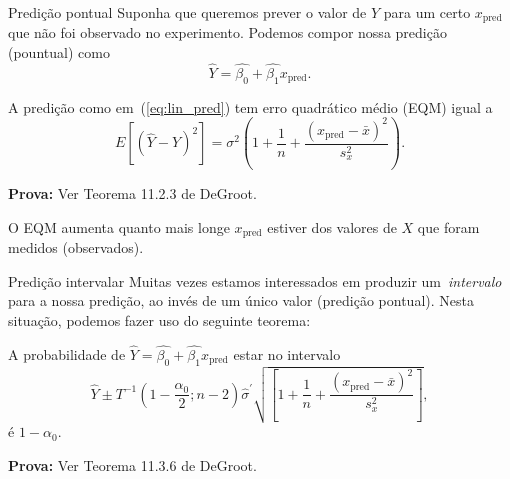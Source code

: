 \begin{frame}{Predição pontual}
Suponha que queremos prever o valor de $Y$ para um certo $x_{\text{pred}}$ que não foi observado no experimento.
Podemos compor nossa predição (pountual) como 
\begin{equation}
 \label{eq:lin_pred}
\hat{Y} = \hat{\beta_0} + \hat{\beta_1}x_{\text{pred}}. 
\end{equation}

\begin{theo}
\label{thm:MSE_linreg_pred}
 A predição como em~(\ref{eq:lin_pred}) tem erro quadrático médio (EQM) igual a
 \[ E\left[\left(\hat{Y} - Y\right)^2\right] = \sigma^2 \left(1 + \frac{1}{n} + \frac{\left(x_{\text{pred}}-\bar{x}\right)^2}{s_x^2}\right). \] 
\end{theo}
\textbf{Prova:} Ver Teorema 11.2.3 de DeGroot.

\begin{obs}
 O EQM aumenta quanto mais longe $x_{\text{pred}}$ estiver dos valores de $X$ que foram medidos (observados).
\end{obs}
\end{frame}

\begin{frame}{Predição intervalar}
Muitas vezes estamos interessados em produzir um~\textit{intervalo} para a nossa predição, ao invés de um único valor (predição pontual). 
Nesta situação, podemos fazer uso do seguinte teorema:
\begin{theo}
\label{thm:CI_pred_mean}
A probabilidade de $\hat{Y} = \hat{\beta_0} + \hat{\beta_1}x_{\text{pred}}$ estar no intervalo
\begin{equation*}
 \hat{Y} \pm T^{-1}\left(1-\frac{\alpha_0}{2}; n-2\right)\hat{\sigma}^\prime \sqrt{\left[ 1+ \frac{1}{n} + \frac{\left(x_{\text{pred}}-\bar{x}\right)^2}{s_x^2} \right]},
\end{equation*}
é $1-\alpha_0$.
\end{theo}
\textbf{Prova:} Ver Teorema 11.3.6 de DeGroot.
\end{frame}

